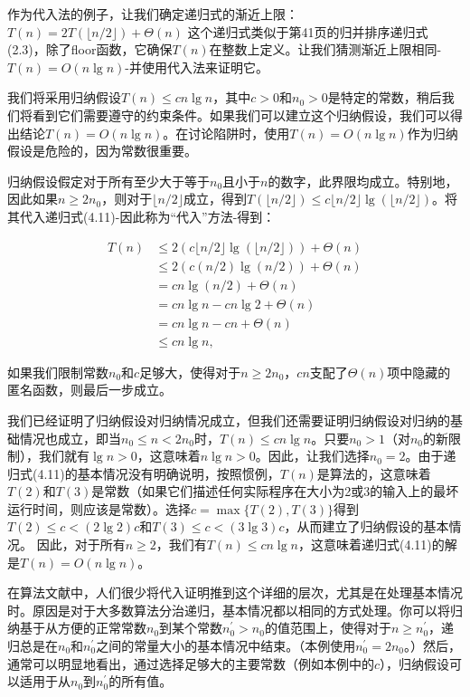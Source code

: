 \documentclass[lang=cn,newtx,10pt,scheme=chinese]{elegantbook}
\begin{document}
作为代入法的例子，让我们确定递归式的渐近上限：
$T(n)=2 T(\lfloor n / 2\rfloor)+\Theta(n)$
这个递归式类似于第41页的归并排序递归式(2.3)，除了floor函数，它确保$T(n)$在整数上定义。让我们猜测渐近上限相同-$T(n)=O(n \lg n)$-并使用代入法来证明它。

我们将采用归纳假设$T(n) \leq c n \lg n$，其中$c>0$和$n_0>0$是特定的常数，稍后我们将看到它们需要遵守的约束条件。如果我们可以建立这个归纳假设，我们可以得出结论$T(n)=O(n \lg n)$。在讨论陷阱时，使用$T(n)=O(n \lg n)$作为归纳假设是危险的，因为常数很重要。

归纳假设假定对于所有至少大于等于$n_0$且小于$n$的数字，此界限均成立。特别地，因此如果$n \geq 2 n_0$，则对于$\lfloor n / 2\rfloor$成立，得到$T(\lfloor n / 2\rfloor) \leq c\lfloor n / 2\rfloor \lg (\lfloor n / 2\rfloor)$。将其代入递归式(4.11)-因此称为“代入”方法-得到：

$$
\begin{aligned}
T(n) & \leq 2(c\lfloor n / 2\rfloor \lg (\lfloor n / 2\rfloor))+\Theta(n) \\
& \leq 2(c(n / 2) \lg (n / 2))+\Theta(n) \\
& =c n \lg (n / 2)+\Theta(n) \\
& =c n \lg n-c n \lg 2+\Theta(n) \\
& =c n \lg n-c n+\Theta(n) \\
& \leq c n \lg n,
\end{aligned}
$$

如果我们限制常数$n_0$和$c$足够大，使得对于$n \geq 2 n_0$，$c n$支配了$\Theta(n)$项中隐藏的匿名函数，则最后一步成立。

我们已经证明了归纳假设对归纳情况成立，但我们还需要证明归纳假设对归纳的基础情况也成立，即当$n_0 \leq n<2 n_0$时，$T(n) \leq c n \lg n$。只要$n_0>1$（对$n_0$的新限制），我们就有$\lg n>0$，这意味着$n \lg n>0$。因此，让我们选择$n_0=2$。由于递归式(4.11)的基本情况没有明确说明，按照惯例，$T(n)$是算法的，这意味着$T(2)$和$T(3)$是常数（如果它们描述任何实际程序在大小为2或3的输入上的最坏运行时间，则应该是常数）。选择$c=\max \{T(2), T(3)\}$得到$T(2) \leq c<(2 \lg 2) c$和$T(3) \leq c<(3 \lg 3) c$，从而建立了归纳假设的基本情况。
因此，对于所有$n \geq 2$，我们有$T(n) \leq c n \lg n$，这意味着递归式(4.11)的解是$T(n)=O(n \lg n)$。

在算法文献中，人们很少将代入证明推到这个详细的层次，尤其是在处理基本情况时。原因是对于大多数算法分治递归，基本情况都以相同的方式处理。你可以将归纳基于从方便的正常常数$n_0$到某个常数$n_0^{\prime}>n_0$的值范围上，使得对于$n \geq n_0^{\prime}$，递归总是在$n_0$和$n_0^{\prime}$之间的常量大小的基本情况中结束。（本例使用$n_0^{\prime}=2 n_0$。）然后，通常可以明显地看出，通过选择足够大的主要常数（例如本例中的$c$），归纳假设可以适用于从$n_0$到$n_0^{\prime}$的所有值。
\end{document}
